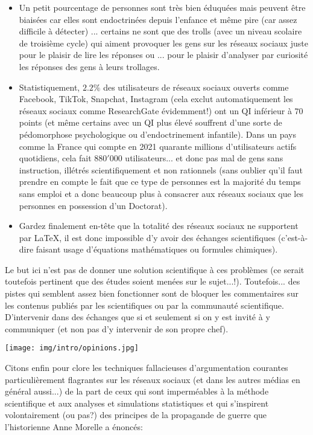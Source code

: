 \begin{itemize}
		\item Un petit pourcentage de personnes sont très bien éduquées mais peuvent être biaisées car elles sont endoctrinées depuis l'enfance et même pire (car assez difficile à détecter) ... certains ne sont que des trolls (avec un niveau scolaire de troisième cycle) qui aiment provoquer les gens sur les réseaux sociaux juste pour le plaisir de lire les réponses ou ... pour le plaisir d'analyser par curiosité les réponses des gens à leurs trollages.
		
		\item Statistiquement, $2.2\%$ des utilisateurs de réseaux sociaux ouverts comme Facebook, TikTok, Snapchat, Instagram (cela exclut automatiquement les réseaux sociaux comme ResearchGate évidemment!) ont un QI inférieur à $70$ points (et même certains avec un QI plus élevé souffrent d'une sorte de pédomorphose psychologique ou d'endoctrinement infantile). Dans un pays comme la France qui compte en 2021 quarante millions d'utilisateurs actifs quotidiens, cela fait $880'000$ utilisateurs... et donc pas mal de gens sans instruction, illétrés scientifiquement et non rationnels (sans oublier qu'il faut prendre en compte le fait que ce type de personnes est la majorité du temps sans emploi et a donc beaucoup plus à consacrer aux réseaux sociaux que les personnes en possession d'un Doctorat).
	
		\item Gardez finalement en-tête que la totalit\'e des r\'eseaux sociaux ne supportent par \LaTeX{}, il est donc impossible d'y avoir des \'echanges scientifiques (c'est-à-dire faisant usage d'\'equations math\'ematiques ou formules chimiques).
	\end{itemize}
	Le but ici n'est pas de donner une solution scientifique à ces problèmes (ce serait toutefois pertinent que des \'etudes soient men\'ees sur le sujet...!). Toutefois... des pistes qui semblent assez bien fonctionner sont de bloquer les commentaires sur les contenus publi\'es par les scientifiques ou par la communaut\'e scientifique. D'intervenir dans des \'echanges que si et seulement si on y est invit\'e à y communiquer (et non pas d'y intervenir de son propre chef).
	\begin{center}
		\texttt{[image: img/intro/opinions.jpg]}
	\end{center}
	Citons enfin pour clore les techniques fallacieuses d'argumentation courantes particulièrement flagrantes sur les r\'eseaux sociaux (et dans les autres m\'edias en g\'en\'eral aussi...) de la part de ceux qui sont imperm\'eables à la m\'ethode scientifique et aux analyses et simulations statistiques et qui s'inspirent volontairement (ou pas?) des principes de la propagande de guerre que l'historienne Anne Morelle a \'enonc\'es:
